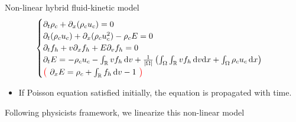 \documentclass{beamer}
\begin{document}
\begin{frame}{Non-linear hybrid fluid-kinetic model}
  $$
    \begin{cases}
      \partial_t \rho_c + \partial_x(\rho_cu_c) = 0\\
      \partial_t(\rho_cu_c) + \partial_x(\rho_cu_c^2)-\rho_cE = 0\\
      \partial_tf_h + v\partial_xf_h + E\partial_vf_h = 0\\
      \partial_tE = -\rho_cu_c - \int_\mathbb{R}vf_h\,\mathrm{d}v + \frac{1}{|\Omega|}\left(\int_\Omega\int_\mathbb{R}vf_h\,\mathrm{d}v\mathrm{d}x + \int_\Omega\rho_cu_c\,\mathrm{d}x \right)\\
      {\color{red}\left(\phantom{\frac{}{}}\right.} \partial_xE = \rho_c + \int_\mathbb{R}f_h\,\mathrm{d}v - 1 {\color{red}\left.\phantom{\frac{}{}}\right)}
    \end{cases}
  $$
  \begin{itemize}
    \item If Poisson equation satisfied initially, the equation is propagated with time.
  \end{itemize}
  Following physicists framework, we linearize this non-linear model
\end{frame}
\end{document}
